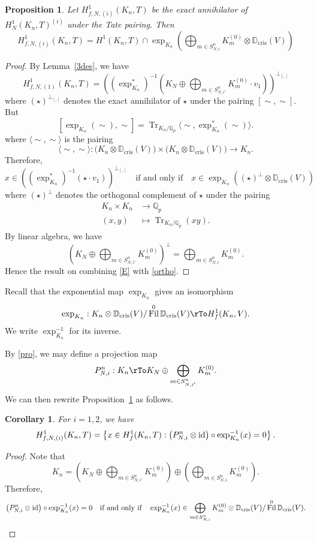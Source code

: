 \documentclass{amsart}
\newcommand{\QQ}{\mathbb Q}
\newcommand{\DD}{\mathbb D}
\DeclareMathOperator{\Tr}{Tr}
\DeclareMathOperator{\cris}{cris}
\DeclareMathOperator{\Fil}{Fil}
\newcommand{\Qp}{\QQ_p}
\newtheorem{proposition}[theorem]{Proposition}
\newtheorem{corollary}[theorem]{Corollary}
\begin{document}
  \begin{proposition}\label{describingortho}
   Let $H^1_{f,N,(i)}(K_n,T)$ be the exact annihilator of $H_N^1(K_n,T)^{(i)}$ under the Tate pairing. Then 
   \[
     H_{f,N,(i)}^1(K_n,T) = H^1(K_n,T)\cap \exp_{K_n}\left( \bigoplus_{m\in S_{N,i}^n}K_{m}^{(0)} \otimes\DD_{\cris}(V) \right)
   \]
  \end{proposition}
  \begin{proof}
By Lemma~\ref{3des}, we have
   \begin{equation}\label{E}
    H^1_{f,N,(1)}(K_n,T)=\left(\left(\exp^*_{K_n}\right)^{-1}\left(K_N\oplus\bigoplus_{m\in S_{N,i'}^n}K_{m}^{(0)}\cdot v_1\right)\right)^{\bot_{[,]}}
   \end{equation}
where $(\star)^{\bot_{[,]}}$ denotes the exact annihilator of $\star$ under the pairing $[\sim,\sim]$. But
\[
[\exp_{K_n}(\sim),\sim]=\Tr_{K_n/\Qp}\langle\sim,\exp^*_{K_n}(\sim)\rangle.
\] 
where $\langle\sim,\sim\rangle$ is the pairing
\[
\langle\sim,\sim\rangle:\Big(K_n\otimes\DD_{\cris}(V)\Big)\times\Big(K_n\otimes\DD_{\cris}(V)\Big)\rightarrow K_n.
\] 
Therefore,
\begin{equation}\label{ortho}
x\in\left(\left(\exp^*_{K_n}\right)^{-1}\left(\star\cdot v_1\right)\right)^{\bot_{[,]}}\quad\text{if and only if}\quad x\in\exp_{K_n}\left((\star)^\bot\otimes\DD_{\cris}(V)\right)
\end{equation}
     where $(\star)^\bot$ denotes the orthogonal complement of $\star$ under the pairing
     \begin{align*}
      K_n\times K_n &\rightarrow \Qp\\
      (x,y) &\mapsto \Tr_{K_n/\Qp}(xy).
     \end{align*}
    By linear algebra, we have
\[
\left(K_N\oplus\bigoplus_{m\in S_{N,i'}^n}K_{m}^{(0)}\right)^\bot=\bigoplus_{m\in S_{N,i}^n}K_{m}^{(0)}.
\]
Hence the result on combining \eqref{E} with \eqref{ortho}.
  \end{proof}


Recall that the exponential map $\exp_{K_n}$ gives an isomorphism
\[
\exp_{K_n}:K_n\otimes\DD_{\cris}(V)/\Fil^0\DD_{\cris}(V)\rTo H^1_f(K_n,V).
\]
We write $\exp_{K_n}^{-1}$ for its inverse.

By \eqref{pro}, we may define a projection map
\[
P_{N,i}^n:K_n\rTo K_N\oplus\bigoplus_{m\in S_{N,i'}^n}K_m^{(0)}.
\]
We can then rewrite Proposition~\ref{describingortho} as follows. 

\begin{corollary}
For $i=1,2$, we have
\[
 H_{f,N,(i)}^1(K_n,T) = \left\{x\in H_{f}^1(K_n,T):\left(P_{N,i}^n\otimes{\rm id}\right)\circ\exp_{K_n}^{-1}(x)=0\right\}.
\]
\end{corollary}
\begin{proof}
Note that
\[
K_n=\left(K_N\oplus\bigoplus_{m\in S_{N,i'}^n}K_m^{(0)}\right)\oplus\left( \bigoplus_{m\in S_{N,i}^n}K_{m}^{(0)}\right).
\]
Therefore, 
\[
\left(P_{N,i}^n\otimes{\rm id}\right)\circ\exp_{K_n}^{-1}(x)=0\quad\text{if and only if}\quad\exp_{K_n}^{-1}(x)\in \bigoplus_{m\in S_{N,i}^n}K_{m}^{(0)}\otimes\DD_{\cris}(V)/\Fil^0\DD_{\cris}(V).
\]
\end{proof}
\end{document}
